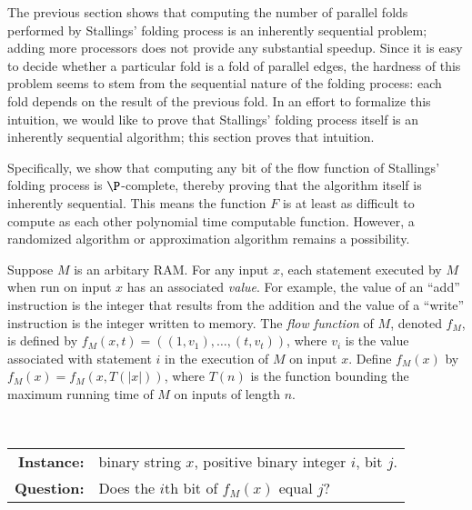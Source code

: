\documentclass{elsarticlenonatbib}
\begin{document}
The previous section shows that computing the number of parallel folds performed by Stallings' folding process is an inherently sequential problem; adding more processors does not provide any substantial speedup.
Since it is easy to decide whether a particular fold is a fold of parallel edges, the hardness of this problem seems to stem from the sequential nature of the folding process: each fold depends on the result of the previous fold.
In an effort to formalize this intuition, we would like to prove that Stallings' folding process itself is an inherently sequential algorithm;
this section proves that intuition.

%
Specifically, we show that computing any bit of the flow function of Stallings' folding process is $\P$-complete, thereby proving that the algorithm itself is inherently sequential.
This means the function $F$ is at least as difficult to compute as each other polynomial time computable function.
However, a randomized algorithm or approximation algorithm remains a possibility.

Suppose $M$ is an arbitary RAM.
For any input $x$, each statement executed by $M$ when run on input $x$ has an associated \emph{value}.
For example, the value of an ``add'' instruction is the integer that results from the addition and the value of a ``write'' instruction is the integer written to memory.
The \emph{flow function} of $M$, denoted $f_M$, is defined by $f_M(x, t) = ((1, v_1), \dotsc, (t, v_t))$, where $v_i$ is the value associated with statement $i$ in the execution of $M$ on input $x$.
Define $f_M(x)$ by $f_M(x) = f_M(x, T(|x|))$, where $T(n)$ is the function bounding the maximum running time of $M$ on inputs of length $n$.

\begin{definition}
  \mbox{} \\
  \begin{tabular}{r p{9.5cm}}
    \textbf{Instance:} & binary string $x$, positive binary integer $i$, bit $j$. \\
    \textbf{Question:} & Does the $i$th bit of $f_M(x)$ equal $j$?
  \end{tabular}
\end{definition}
\end{document}
